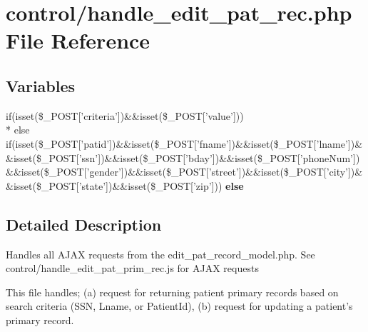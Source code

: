 \hypertarget{handle__edit__pat__rec_8php}{\section{control/handle\-\_\-edit\-\_\-pat\-\_\-rec.php File Reference}
\label{handle__edit__pat__rec_8php}
}
\subsection*{Variables}
\begin{DoxyCompactItemize}
\item 
if(isset(\$\-\_\-\-P\-O\-S\-T\mbox{[}'criteria'\mbox{]})\&\&isset(\$\-\_\-\-P\-O\-S\-T\mbox{[}'value'\mbox{]})) \\*
else if(isset(\$\-\_\-\-P\-O\-S\-T\mbox{[}'patid'\mbox{]})\&\&isset(\$\-\_\-\-P\-O\-S\-T\mbox{[}'fname'\mbox{]})\&\&isset(\$\-\_\-\-P\-O\-S\-T\mbox{[}'lname'\mbox{]})\&\&isset(\$\-\_\-\-P\-O\-S\-T\mbox{[}'ssn'\mbox{]})\&\&isset(\$\-\_\-\-P\-O\-S\-T\mbox{[}'bday'\mbox{]})\&\&isset(\$\-\_\-\-P\-O\-S\-T\mbox{[}'phone\-Num'\mbox{]})\&\&isset(\$\-\_\-\-P\-O\-S\-T\mbox{[}'gender'\mbox{]})\&\&isset(\$\-\_\-\-P\-O\-S\-T\mbox{[}'street'\mbox{]})\&\&isset(\$\-\_\-\-P\-O\-S\-T\mbox{[}'city'\mbox{]})\&\&isset(\$\-\_\-\-P\-O\-S\-T\mbox{[}'state'\mbox{]})\&\&isset(\$\-\_\-\-P\-O\-S\-T\mbox{[}'zip'\mbox{]})) {\bfseries else}
\end{DoxyCompactItemize}


\subsection{Detailed Description}
Handles all A\-J\-A\-X requests from the edit\-\_\-pat\-\_\-record\-\_\-model.\-php. See control/handle\-\_\-edit\-\_\-pat\-\_\-prim\-\_\-rec.\-js for A\-J\-A\-X requests

This file handles; (a) request for returning patient primary records based on search criteria (S\-S\-N, Lname, or Patient\-Id), (b) request for updating a patient's primary record. 

